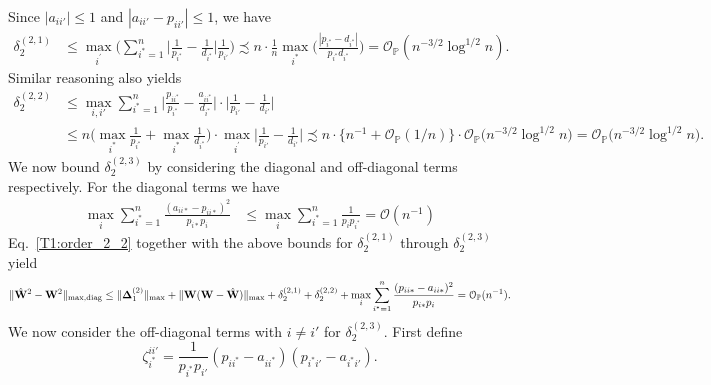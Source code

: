 \documentclass[10pt,journal,compsoc]{IEEEtran}
\newcommand{\op}{\mathcal{O}_{\mathbb{P}}}
\newcommand{\ee}{\end{aligned} \end{equation}}
\newcommand{\BL}{\Big (}
\newcommand{\BR}{\Big )}
\newcommand{\MD}{\mathbf{\Delta}}
\newcommand{\MDG}{\max,\mathrm{diag}}
\newcommand{\bee}{\begin{equation}\begin{aligned}}
\newcommand{\M}[1]{{{\mathbf{\MakeUppercase{#1}}}}}
\numberwithin{equation}{section}
\begin{document}
Since $|a_{ii'}| \leq 1$ and $|a_{ii'}-p_{ii'}|\leq 1$, we have
\begin{equation*}
  \begin{split}
\delta^{(2,1)}_2 &\leq  \max_{i^{'}}\BL\sum_{i^* =
  1}^{n}\Big|\frac{1}{p_{i^*}} - \frac{1}{d_{i^*}}\Big|
\frac{1}{p_{i'}} \BR
\precsim n\cdot \frac{1}{n}\max_{i^*}\BL\frac{|p_{i^*} -
  d_{i^*}|}{p_{i^*} d_{i^*}}
\BR %
= \op(n^{-3/2}\log^{1/2}{n}).
\end{split}
\end{equation*}
Similar reasoning also yields
\begin{equation*}
  \begin{split}
 \delta^{(2,2)}_{2}&\leq \max_{i,{i'}}\sum_{i^* = 1}^{n}\Big|\frac{p_{ii^*}}{p_{i^*}} - \frac{a_{ii^*}}{d_{i^*}}\Big| \cdot \Big| \frac{1}{p_{i'}} - \frac{1}{d_{i'}}\Big|
\\
&\leq n \BL \max_{i^*}\frac{1}{p_{i^*}} + \max_{i^*}\frac{1}{d_{i^*}}\BR\cdot \max_{i^{'}}\Big|\frac{1}{p_{i'}} - \frac{1}{d_{i'}} \Big|
\precsim n\cdot \big\{n^{-1} + \op(1/n)\big\} \cdot \op\big(n^{-3/2} \log^{1/2}{n}\big)
  = \op\big(n^{-3/2}\log^{1/2}{n}\big).
\end{split}
\end{equation*}
We now bound $\delta^{(2,3)}_{2}$ by considering the diagonal and
off-diagonal terms respectively. For the diagonal terms we have
\bee\label{t:d:d223}
\max_{i}\sum_{i^{*}= 1}^{n}\!\frac{(a_{ii*} - p_{ii*})^2}{p_{i*} p_i}
& \leq \max_{i} \!\sum_{i^* = 1}^{n}
\frac{1}{p_ip_{i^*}} 
\!=\mathcal{O}(n^{-1})\!
\ee
Eq.~\eqref{T1:order_2_2} together with the above bounds for $\delta_2^{(2,1)}$ through
$\delta_{2}^{(2,3)}$ yield
\bee\label{T22:res1}
\|\hat{\M W}^2 - \M W^2\|_{\max,\text{diag}} 
\leq \|\MD^{(2)}_1\|_{\max} + \|\M W(\M W - \hat{\M W})\|_{\max} 
+ \delta^{(2,1)}_{2}  + \delta^{(2,2)}_{2}  
+\max_{i} \sum_{i^{*}= 1}^{n}\frac{(p_{ii*} - a_{ii*})^2}{p_{i*}
  p_{i}} = \op(n^{-1}).
\ee
We now consider the off-diagonal terms with $i \not = i'$ for
$\delta_{2}^{(2,3)}$. First define
$$\zeta_{i^*}^{ii'} = \frac{1}{p_{i^*} p_{i'}} (p_{ii^*} -
a_{ii^*})(p_{i^*i'} - a_{i^*i'}).$$
\end{document}
